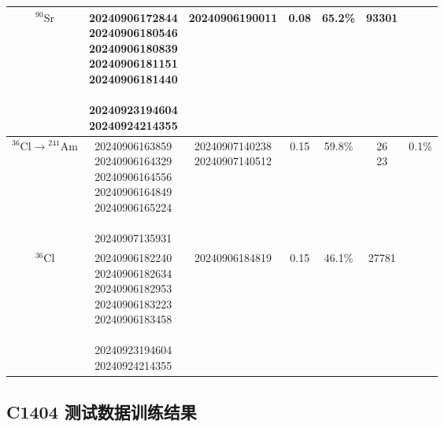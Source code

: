 \begin{longtable}{c c c c c c c}
    \midrule
    $\mathrm{^{90}Sr}$  &   \makecell[c]{20240906172844 \\ 20240906180546 \\ 20240906180839 \\ 20240906181151 \\  20240906181440 \\ \\ 20240923194604 \\ 20240924214355}    &   20240906190011  &   0.08    &   65.2\%  &   93301   &   \\
    \midrule
    $\mathrm{^{36}Cl}\rightarrow\mathrm{^{241}Am}$  &   \makecell[c]{20240906163859 \\ 20240906164329 \\ 20240906164556 \\ 20240906164849 \\ 20240906165224 \\ \\ 20240907135931}   &   \makecell[c]{20240907140238 \\ 20240907140512}  &   0.15    &   59.8\%  &   \makecell[c]{26 \\ 23}    &   0.1\%  \\
    \midrule
    $\mathrm{^{36}Cl}$  &   \makecell[c]{20240906182240 \\ 20240906182634 \\ 20240906182953 \\ 20240906183223 \\ 20240906183458 \\ \\ 20240923194604 \\ 20240924214355}   &   20240906184819    &   0.15    &   46.1\%  &   27781   &   \\
    \bottomrule
\end{longtable}

\subsection{C1404 测试数据训练结果}

